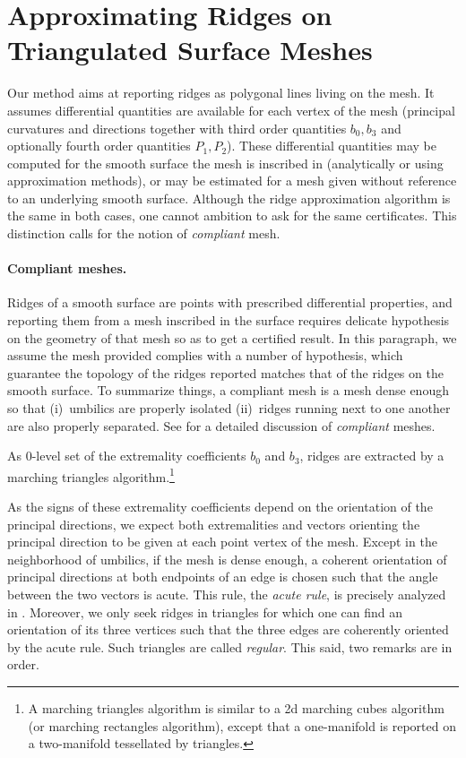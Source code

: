 \section{Approximating  Ridges on Triangulated Surface Meshes}
\label{ridge-mesh}

Our method aims at reporting ridges as polygonal lines living on the
mesh. It assumes differential quantities are available for each vertex
of the mesh (principal curvatures and directions together with third
order quantities $b_0, b_3$ and optionally fourth order quantities
$P_1, P_2$). These differential quantities may be computed for the
smooth surface the mesh is inscribed in (analytically or using
approximation methods), or may be estimated for a mesh given without
reference to an underlying smooth surface. Although the ridge
approximation algorithm is the same in both cases, one cannot ambition
to ask for the same certificates.  This distinction calls for the
notion of {\em compliant} mesh.


\paragraph{Compliant meshes.}
Ridges of a smooth surface are points with prescribed differential
properties, and reporting them from a mesh inscribed in the surface
requires delicate hypothesis on the geometry of that mesh so as to get
a certified result. In this paragraph, we assume the mesh provided
complies with a number of hypothesis, which guarantee the topology of
the ridges reported matches that of the ridges on the smooth
surface. To summarize things, a compliant mesh is a mesh dense enough
so that (i)\ umbilics are properly isolated (ii)\ ridges running next
to one another are also properly separated.
See \cite{cgal:cp-tdare-05} for a detailed discussion of {\em
compliant} meshes.  \medskip

As 0-level set of the extremality coefficients $b_0$ and $b_3$, ridges
are extracted by a marching triangles algorithm.\footnote{A marching
triangles algorithm is similar to a 2d marching cubes algorithm (or
marching rectangles algorithm), except that a one-manifold is
reported on a two-manifold tessellated by triangles.}

As the signs of these extremality coefficients depend on the
orientation of the principal directions, we expect both extremalities
and vectors orienting the principal direction to be given at each
point vertex of the mesh. Except in the neighborhood of umbilics, if
the mesh is dense enough, a coherent orientation of principal
directions at both endpoints of an edge is chosen such that the angle
between the two vectors is acute. This rule, the {\em acute rule}, is
precisely analyzed in \cite{cgal:cp-tdare-05}.
Moreover, we only seek ridges in triangles for which one can find an
orientation of its three vertices such that the three edges are
coherently oriented by the acute rule. Such triangles are called
{\em regular}. This said, two remarks are in order.

